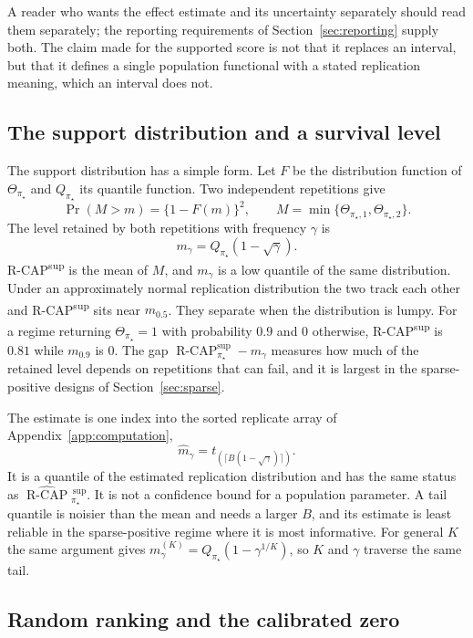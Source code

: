 \documentclass[11pt]{article}
\newcommand{\RCAP}{\operatorname{R\text{-}CAP}^{\mathrm{sup}}_{\pi_\star}}
\newcommand{\RCAPHat}{\widehat{\operatorname{R\text{-}CAP}}{}^{\,\mathrm{sup}}_{\pi_\star}}
\theoremstyle{remark}
\begin{document}
A reader who wants the effect estimate and its uncertainty separately should read them separately; the reporting requirements of Section~\ref{sec:reporting} supply both. The claim made for the supported score is not that it replaces an interval, but that it defines a single population functional with a stated replication meaning, which an interval does not.

\subsection{The support distribution and a survival level}

The support distribution has a simple form. Let $F$ be the distribution function of $\Theta_{\pi_\star}$ and $Q_{\pi_\star}$ its quantile function. Two independent repetitions give
\[
\Pr(M>m)=\{1-F(m)\}^2,
\qquad
M=\min\{\Theta_{\pi_\star,1},\Theta_{\pi_\star,2}\}.
\]
The level retained by both repetitions with frequency $\gamma$ is
\begin{equation}
m_\gamma=Q_{\pi_\star}(1-\sqrt{\gamma}).
\label{eq:survival-level}
\end{equation}
R-CAP\textsuperscript{sup} is the mean of $M$, and $m_\gamma$ is a low quantile of the same distribution. Under an approximately normal replication distribution the two track each other and R-CAP\textsuperscript{sup} sits near $m_{0.5}$. They separate when the distribution is lumpy. For a regime returning $\Theta_{\pi_\star}=1$ with probability $0.9$ and $0$ otherwise, R-CAP\textsuperscript{sup} is $0.81$ while $m_{0.9}$ is $0$. The gap $\RCAP-m_\gamma$ measures how much of the retained level depends on repetitions that can fail, and it is largest in the sparse-positive designs of Section~\ref{sec:sparse}.

The estimate is one index into the sorted replicate array of Appendix~\ref{app:computation},
\[
\widehat m_\gamma=t_{(\lceil B(1-\sqrt{\gamma})\rceil)}.
\]
It is a quantile of the estimated replication distribution and has the same status as $\RCAPHat$. It is not a confidence bound for a population parameter. A tail quantile is noisier than the mean and needs a larger $B$, and its estimate is least reliable in the sparse-positive regime where it is most informative. For general $K$ the same argument gives $m_\gamma^{(K)}=Q_{\pi_\star}(1-\gamma^{1/K})$, so $K$ and $\gamma$ traverse the same tail.

\subsection{Random ranking and the calibrated zero}
\end{document}
